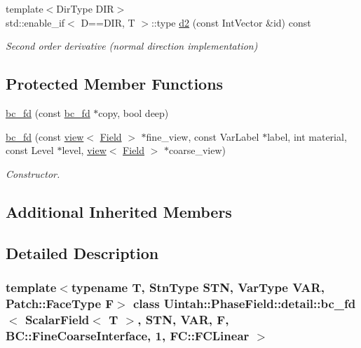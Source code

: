 \begin{DoxyCompactItemize}
{\footnotesize template$<$Dir\+Type D\+IR$>$ }\\std\+::enable\+\_\+if$<$ D==D\+IR, T $>$\+::type \hyperlink{classUintah_1_1PhaseField_1_1detail_1_1bc__fd_3_01ScalarField_3_01T_01_4_00_01STN_00_01VAR_00_01f836207db876ecd28bf65f631f79030f_aba9c7fe1d0f3f241be00431d6b9d1194}{d2} (const Int\+Vector \&id) const
\begin{DoxyCompactList}\small\item\em Second order derivative (normal direction implementation) \end{DoxyCompactList}\end{DoxyCompactItemize}
\subsection*{Protected Member Functions}
\begin{DoxyCompactItemize}
\item 
\hyperlink{classUintah_1_1PhaseField_1_1detail_1_1bc__fd_3_01ScalarField_3_01T_01_4_00_01STN_00_01VAR_00_01f836207db876ecd28bf65f631f79030f_af9dcc3019430b6ed799fee1afd92d062}{bc\+\_\+fd} (const \hyperlink{classUintah_1_1PhaseField_1_1detail_1_1bc__fd}{bc\+\_\+fd} $\ast$copy, bool deep)
\item 
\hyperlink{classUintah_1_1PhaseField_1_1detail_1_1bc__fd_3_01ScalarField_3_01T_01_4_00_01STN_00_01VAR_00_01f836207db876ecd28bf65f631f79030f_aa158ac488b17ef1983cb4cf93523c4b6}{bc\+\_\+fd} (const \hyperlink{classUintah_1_1PhaseField_1_1detail_1_1view}{view}$<$ \hyperlink{structUintah_1_1PhaseField_1_1ScalarField}{Field} $>$ $\ast$fine\+\_\+view, const Var\+Label $\ast$label, int material, const Level $\ast$level, \hyperlink{classUintah_1_1PhaseField_1_1detail_1_1view}{view}$<$ \hyperlink{structUintah_1_1PhaseField_1_1ScalarField}{Field} $>$ $\ast$coarse\+\_\+view)
\begin{DoxyCompactList}\small\item\em Constructor. \end{DoxyCompactList}\end{DoxyCompactItemize}
\subsection*{Additional Inherited Members}


\subsection{Detailed Description}
\subsubsection*{template$<$typename T, Stn\+Type S\+TN, Var\+Type V\+AR, Patch\+::\+Face\+Type F$>$\newline
class Uintah\+::\+Phase\+Field\+::detail\+::bc\+\_\+fd$<$ Scalar\+Field$<$ T $>$, S\+T\+N, V\+A\+R, F, B\+C\+::\+Fine\+Coarse\+Interface, 1, F\+C\+::\+F\+C\+Linear $>$}

